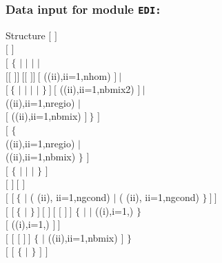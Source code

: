 \clearpage

\subsubsection{Data input for module {\tt EDI:}}\label{sect:descedi}

\begin{DataStructure}{Structure }
$[$   $]$ \\
$[$  $]$ \\
$[$  $\{$  $|$  $|$  $|$  $|$ \\
\hskip 0.8cm   $[[$      $]]~[[$        $]]~[$  ((ii),ii=1,nhom) $]~|$ \\
\hskip 0.8cm  $[~\{$  $|$  $|$  $|$  $|$  $\}~]~[$  ((ii),ii=1,nbmix2) $]~|$ \\
\hskip 0.8cm  ((ii),ii=1,nregio) $|$ \\
\hskip 0.8cm  $[$ ((ii),ii=1,nbmix) $]~\}$ $]$ \\
$[$  $\{$ \\
\hskip 0.8cm  ((ii),ii=1,nregio) $|$ \\
\hskip 0.8cm  ((ii),ii=1,nbmix) $\}$ $]$  \\
$[$ $\{$  $|$  $|$  $|$  $\}$ $]$ \\
$[$  $]~[$  $]$ \\
$[$  $[~\{$   $|$ ( (ii), ii=1,ngcond) $|$ ( (ii), ii=1,ngcond) $\}~]~]$\\
$[$  $[~\{$  $|$ $\}~]~[$  $]~[$  $[$  $]~]$ $\{$  $|$  $|$ 
   ((i),i=1,) $\}$\\
\hskip 0.8cm $[$   ((i),i=1,) $]~]$\\
$[$  $[$  $[$  $]~]$ $\{$  $|$ ((ii),ii=1,nbmix) $]$ $\}$\\ 
$[$  $[$  $\{$  $|$  $\}$ $]$ $]$ \\

\end{DataStructure}
